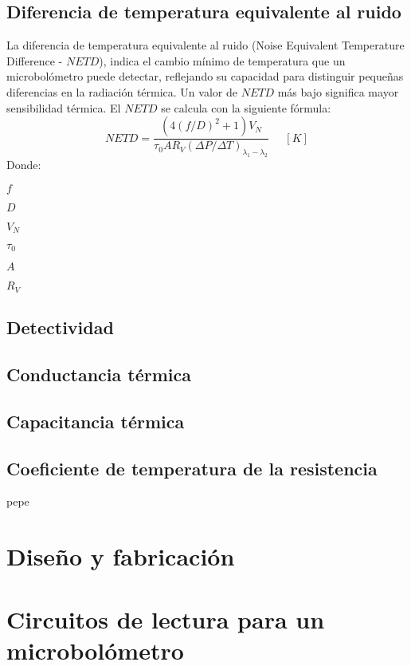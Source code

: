         \subsection{Diferencia de temperatura equivalente al ruido}
        La diferencia de temperatura equivalente al ruido (Noise Equivalent Temperature Difference - $NETD$), indica el cambio mínimo de temperatura que un microbolómetro puede detectar, reflejando su capacidad para distinguir pequeñas diferencias en la radiación térmica. Un valor de $NETD$ más bajo significa mayor sensibilidad térmica.
        El $NETD$ se calcula con la siguiente fórmula:
        \begin{equation}
        NETD = \frac{(4(f/D)^{2} + 1)V_{N}}{\tau_{0}AR_{V}(\Delta P/\Delta T)_{\lambda_{1} - \lambda_{2}}}\phantom{abc} [K]
        \label{eq:NETD}
        \end{equation}        
        Donde:
        
        $f$
        
        $D$
        
        $V_{N}$
        
        $\tau_{0}$
        
        $A$
        
        $R_{V}$
        
        \subsection{Detectividad}
        \subsection{Conductancia térmica}
        \subsection{Capacitancia térmica}
        \subsection{Coeficiente de temperatura de la resistencia}

pepe

\section{Diseño y fabricación}

\section{Circuitos de lectura para un microbolómetro}